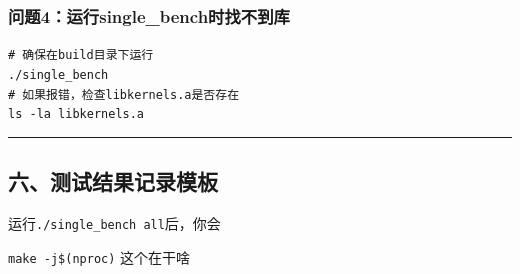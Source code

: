 \documentclass[11pt, a4paper]{article}
\begin{document}
\begin{aibox}
\subsubsection*{问题4：运行single\_bench时找不到库}
\begin{tcolorbox}[colback=white,colframe=gray!50!white,boxrule=0.5pt,arc=2pt,left=5pt,right=5pt,top=5pt,bottom=5pt]
\texttt{\# 确保在build目录下运行}\\
\texttt{./single\_bench}\\[0.5em]
\texttt{\# 如果报错，检查libkernels.a是否存在}\\
\texttt{ls -la libkernels.a}
\end{tcolorbox}

\begin{center}\rule{\textwidth}{0.4pt}\end{center}

\subsection*{六、测试结果记录模板}

运行\texttt{./single\_bench all}后，你会
\end{aibox}

\vspace{1.5em}

\begin{userbox}
\texttt{make -j\$(nproc)} 这个在干啥
\end{userbox}
\end{document}
